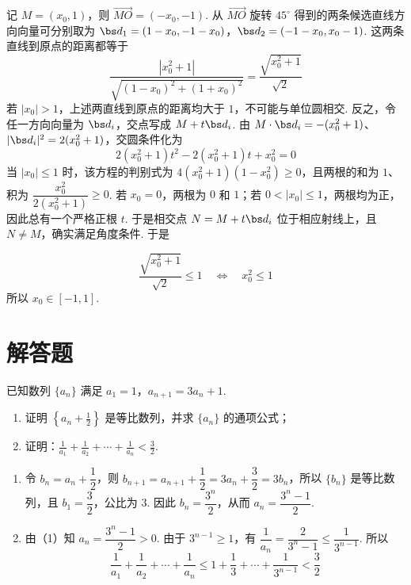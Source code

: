 \begin{solution}
记 \(M=(x_0,1)\)，则 \(\overrightarrow{MO}=(-x_0,-1)\). 从 \(\overrightarrow{MO}\) 旋转 \(45^{\circ}\) 得到的两条候选直线方向向量可分别取为
\(\bs d_1=(1-x_0,-1-x_0)\)，\(\bs d_2=(-1-x_0,x_0-1)\).
这两条直线到原点的距离都等于
\[
\frac{|x_0^2+1|}{\sqrt{(1-x_0)^2+(1+x_0)^2}}
=\frac{\sqrt{x_0^2+1}}{\sqrt2}
\]
若 \(\lvert x_0\rvert>1\)，上述两直线到原点的距离均大于 \(1\)，不可能与单位圆相交. 反之，令任一方向向量为 \(\bs d_i\)，交点写成 \(M+t\bs d_i\). 由 \(M\cdot\bs d_i=-(x_0^2+1)\)、\(\lvert\bs d_i\rvert^2=2(x_0^2+1)\)，交圆条件化为
\[
2(x_0^2+1)t^2-2(x_0^2+1)t+x_0^2=0
\]
当 \(\lvert x_0\rvert\leqslant1\) 时，该方程的判别式为 \(4(x_0^2+1)(1-x_0^2)\geqslant0\)，且两根的和为 \(1\)、积为 \(\dfrac{x_0^2}{2(x_0^2+1)}\geqslant0\). 若 \(x_0=0\)，两根为 \(0\) 和 \(1\)；若 \(0<\lvert x_0\rvert\leqslant1\)，两根均为正，因此总有一个严格正根 \(t\). 于是相交点 \(N=M+t\bs d_i\) 位于相应射线上，且 \(N\ne M\)，确实满足角度条件. 于是

\[
\frac{\sqrt{x_0^2+1}}{\sqrt2}\leqslant1
\quad\Longleftrightarrow\quad x_0^2\leqslant1
\]
所以 \(x_0\in[-1,1]\).
\end{solution}

\section{解答题}

\begin{problem}
已知数列 \(\{a_n\}\) 满足 \(a_1=1\)，\(a_{n+1}=3a_n+1\).
\begin{enumerate}
\item 证明 \(\left\{a_n+\frac{1}{2}\right\}\) 是等比数列，并求 \(\{a_n\}\) 的通项公式；
\item 证明：\(\frac{1}{a_1}+\frac{1}{a_2}+\cdots+\frac{1}{a_n}<\frac{3}{2}\).
\end{enumerate}
\end{problem}

\begin{solution}
\begin{enumerate}
\item 令 \(b_n=a_n+\dfrac{1}{2}\)，则
\(b_{n+1}=a_{n+1}+\dfrac{1}{2}=3a_n+\dfrac{3}{2}=3b_n\)，所以 \(\{b_n\}\) 是等比数列，且 \(b_1=\dfrac{3}{2}\)，公比为 \(3\). 因此 \(b_n=\dfrac{3^n}{2}\)，从而 \(a_n=\dfrac{3^n-1}{2}\).

\item 由（1）知 \(a_n=\dfrac{3^n-1}{2}>0\). 由于 \(3^{n-1}\geqslant1\)，有
\(\dfrac{1}{a_n}=\dfrac{2}{3^n-1}\leqslant\dfrac{1}{3^{n-1}}\). 所以
\[
\frac{1}{a_1}+\frac{1}{a_2}+\cdots+\frac{1}{a_n}
\leqslant 1+\frac{1}{3}+\cdots+\frac{1}{3^{n-1}}
<\frac{3}{2}
\]
\end{enumerate}
\end{solution}

